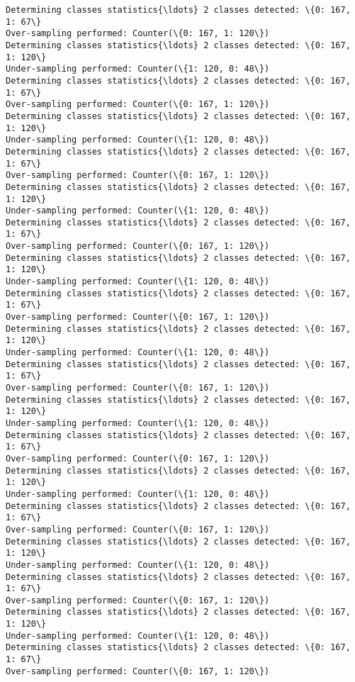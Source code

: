 \documentclass{article}
\begin{document}
    \begin{Verbatim}[commandchars=\\\{\}]
Determining classes statistics{\ldots} 2 classes detected: \{0: 167, 1: 67\}
Over-sampling performed: Counter(\{0: 167, 1: 120\})
Determining classes statistics{\ldots} 2 classes detected: \{0: 167, 1: 120\}
Under-sampling performed: Counter(\{1: 120, 0: 48\})
Determining classes statistics{\ldots} 2 classes detected: \{0: 167, 1: 67\}
Over-sampling performed: Counter(\{0: 167, 1: 120\})
Determining classes statistics{\ldots} 2 classes detected: \{0: 167, 1: 120\}
Under-sampling performed: Counter(\{1: 120, 0: 48\})
Determining classes statistics{\ldots} 2 classes detected: \{0: 167, 1: 67\}
Over-sampling performed: Counter(\{0: 167, 1: 120\})
Determining classes statistics{\ldots} 2 classes detected: \{0: 167, 1: 120\}
Under-sampling performed: Counter(\{1: 120, 0: 48\})
Determining classes statistics{\ldots} 2 classes detected: \{0: 167, 1: 67\}
Over-sampling performed: Counter(\{0: 167, 1: 120\})
Determining classes statistics{\ldots} 2 classes detected: \{0: 167, 1: 120\}
Under-sampling performed: Counter(\{1: 120, 0: 48\})
Determining classes statistics{\ldots} 2 classes detected: \{0: 167, 1: 67\}
Over-sampling performed: Counter(\{0: 167, 1: 120\})
Determining classes statistics{\ldots} 2 classes detected: \{0: 167, 1: 120\}
Under-sampling performed: Counter(\{1: 120, 0: 48\})
Determining classes statistics{\ldots} 2 classes detected: \{0: 167, 1: 67\}
Over-sampling performed: Counter(\{0: 167, 1: 120\})
Determining classes statistics{\ldots} 2 classes detected: \{0: 167, 1: 120\}
Under-sampling performed: Counter(\{1: 120, 0: 48\})
Determining classes statistics{\ldots} 2 classes detected: \{0: 167, 1: 67\}
Over-sampling performed: Counter(\{0: 167, 1: 120\})
Determining classes statistics{\ldots} 2 classes detected: \{0: 167, 1: 120\}
Under-sampling performed: Counter(\{1: 120, 0: 48\})
Determining classes statistics{\ldots} 2 classes detected: \{0: 167, 1: 67\}
Over-sampling performed: Counter(\{0: 167, 1: 120\})
Determining classes statistics{\ldots} 2 classes detected: \{0: 167, 1: 120\}
Under-sampling performed: Counter(\{1: 120, 0: 48\})
Determining classes statistics{\ldots} 2 classes detected: \{0: 167, 1: 67\}
Over-sampling performed: Counter(\{0: 167, 1: 120\})
Determining classes statistics{\ldots} 2 classes detected: \{0: 167, 1: 120\}
Under-sampling performed: Counter(\{1: 120, 0: 48\})
Determining classes statistics{\ldots} 2 classes detected: \{0: 167, 1: 67\}
Over-sampling performed: Counter(\{0: 167, 1: 120\})

\end{Verbatim}
\end{document}
